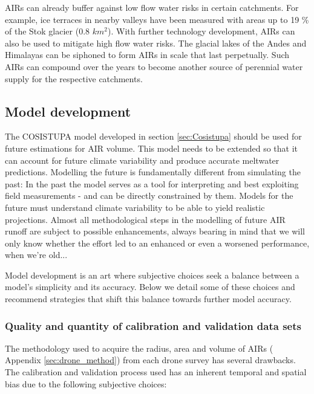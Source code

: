 AIRs can already buffer against low flow water risks in certain catchments. For example, ice
terraces in nearby valleys have been measured with areas up to 19 \% of the Stok glacier (0.8 $km^2$). With further technology
development, AIRs can also be used to mitigate high flow water risks. The glacial lakes of the Andes and
Himalayas can be siphoned to form AIRs in scale that last perpetually. Such AIRs can compound over the years to
become another source of perennial water supply for the respective catchments.


\subsection{Model development}

The COSISTUPA model developed in section \ref{sec:Cosistupa} should be used for future estimations for AIR
volume. This model needs to be extended so that it can account for future climate variability and produce
accurate meltwater predictions. Modelling the future is fundamentally different from simulating the past: In the
past the model serves as a tool for interpreting and best exploiting field measurements - and can be directly
constrained by them. Models for the future must understand climate variability to be able to yield realistic
projections. Almost all methodological steps in the modelling of future AIR runoff are subject to possible
enhancements, always bearing in mind that we will only know whether the effort led to an enhanced or even a
worsened performance, when we're old...

Model development is an art where subjective choices seek a balance between a model's simplicity and its
accuracy. Below we detail some of these choices and recommend strategies that shift this balance towards further
model accuracy.

\subsubsection{Quality and quantity of calibration and validation data sets}

The methodology used to acquire the radius, area and volume of \ac{AIRs} ( Appendix \ref{sec:drone_method}) from
each drone survey has several drawbacks. The calibration and validation process used has an inherent temporal
and spatial bias due to the following subjective choices:

